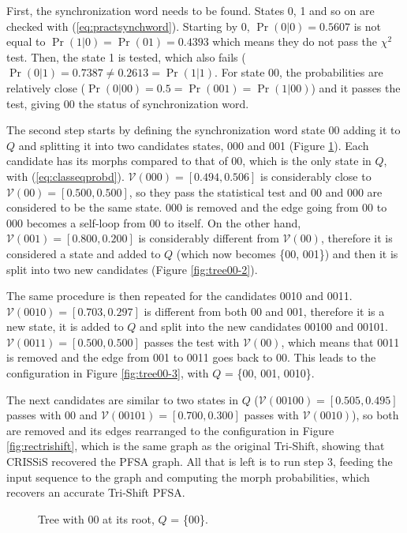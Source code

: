 {First, the synchronization word needs to be found. States 0, 1 and so on are checked with (\ref{eq:practsynchword}). Starting by 0, $\Pr(0|0) = 0.5607$ is not equal to $\Pr(1|0) = \Pr(01)= 0.4393$ which means they do not pass the $\chi^2$ test. Then, the state 1 is tested, which also fails ($\Pr(0|1) = 0.7387 \neq 0.2613 = \Pr(1|1)$. For state 00, the probabilities are relatively close ($\Pr(0|00) = 0.5 = \Pr(001) = \Pr(1|00)$) and it passes the test, giving 00 the status of synchronization word.

The second step starts by defining the synchronization word state 00 adding it to $Q$ and splitting it into two candidates states, 000 and 001 (Figure \ref{fig:tree00}). Each candidate has its morphs compared to that of 00, which is the only state in $Q$, with (\ref{eq:classeqprobd}). $\mathcal{V}(000) = [0.494, 0.506]$ is considerably close to $\mathcal{V}(00) = [0.500, 0.500]$, so they pass the statistical test and 00 and 000 are considered to be the same state. 000 is removed and the edge going from 00 to 000 becomes a self-loop from 00 to itself. On the other hand, $\mathcal{V}(001) = [0.800, 0.200]$ is considerably different from $\mathcal{V}(00)$, therefore it is considered a state and added to $Q$ (which now becomes \{00, 001\}) and then it is split into two new candidates (Figure \ref{fig:tree00-2}).

The same procedure is then repeated for the candidates 0010 and 0011. $\mathcal{V}(0010) = [0.703, 0.297]$ is different from both 00 and 001, therefore it is a new state, it is added to $Q$ and split into the new candidates 00100 and 00101. $\mathcal{V}(0011) = [0.500, 0.500]$ passes the test with $\mathcal{V}(00)$, which means that 0011 is removed and the edge from 001 to 0011 goes back to 00. This leads to the configuration in Figure \ref{fig:tree00-3}, with $Q$ = \{00, 001, 0010\}.

The next candidates are similar to two states in $Q$ ($\mathcal{V}(00100) = [0.505, 0.495]$ passes with 00 and $\mathcal{V}(00101) = [0.700, 0.300]$ passes with $\mathcal{V}(0010)$), so both are removed and its edges rearranged to the configuration in Figure \ref{fig:rectrishift}, which is the same graph as the original Tri-Shift, showing that CRISSiS recovered the PFSA graph. All that is left is to run step 3, feeding the input sequence to the graph and computing the morph probabilities, which recovers an accurate Tri-Shift PFSA.

\begin{figure}[t]
\centering
{}
\caption{Tree with 00 at its root, $Q$ = \{00\}. \label{fig:tree00}}
\end{figure}

}
